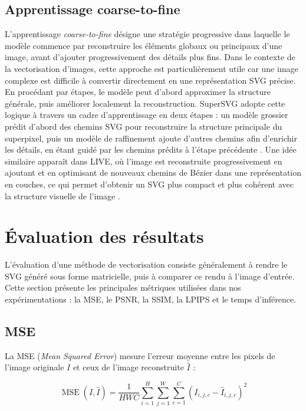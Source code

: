 \documentclass[12pt, a4paper, oneside]{report}
\begin{document}
    \subsection{Apprentissage coarse-to-fine}
	L'apprentissage \textit{coarse-to-fine} désigne une stratégie progressive dans laquelle le modèle commence par reconstruire les éléments globaux ou principaux d'une image, avant d'ajouter progressivement des détails plus fins. Dans le contexte de la vectorisation d'images, cette approche est particulièrement utile car une image complexe est difficile à convertir directement en une représentation SVG précise. En procédant par étapes, le modèle peut d'abord approximer la structure générale, puis améliorer localement la reconstruction. SuperSVG adopte cette logique à travers un cadre d'apprentissage en deux étapes : un modèle grossier prédit d'abord des chemins SVG pour reconstruire la structure principale du superpixel, puis un modèle de raffinement ajoute d'autres chemins afin d'enrichir les détails, en étant guidé par les chemins prédits à l'étape précédente \cite{hu2024supersvg}. Une idée similaire apparaît dans LIVE, où l'image est reconstruite progressivement en ajoutant et en optimisant de nouveaux chemins de Bézier dans une représentation en couches, ce qui permet d'obtenir un SVG plus compact et plus cohérent avec la structure visuelle de l'image \cite{ma2022live}.
	
\section{Évaluation des résultats}

L'évaluation d'une méthode de vectorisation consiste généralement à rendre le SVG généré sous forme matricielle, puis à comparer ce rendu à l'image d'entrée. Cette section présente les principales métriques utilisées dans nos expérimentations : la MSE, le PSNR, la SSIM, la LPIPS et le temps d'inférence.

\subsection{MSE}

La MSE (\textit{Mean Squared Error}) mesure l'erreur moyenne entre les pixels de l'image originale $I$ et ceux de l'image reconstruite $\hat{I}$ :

\begin{equation}
    \operatorname{MSE}(I,\hat{I}) =
    \frac{1}{HWC}
    \sum_{i=1}^{H}
    \sum_{j=1}^{W}
    \sum_{c=1}^{C}
    \left(I_{i,j,c}-\hat{I}_{i,j,c}\right)^2
    \label{eq:mse}
\end{equation}
\end{document}
